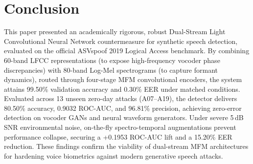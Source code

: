 \documentclass[runningheads]{llncs}
\begin{document}
\section{Conclusion}
\label{sec:conclusion}
This paper presented an academically rigorous, robust Dual-Stream Light Convolutional Neural Network countermeasure for synthetic speech detection, evaluated on the official ASVspoof 2019 Logical Access benchmark. By combining 60-band LFCC representations (to expose high-frequency vocoder phase discrepancies) with 80-band Log-Mel spectrograms (to capture formant dynamics), routed through four-stage MFM convolutional encoders, the system attains 99.50\% validation accuracy and 0.30\% EER under matched conditions. Evaluated across 13 unseen zero-day attacks (A07--A19), the detector delivers 80.50\% accuracy, 0.9032 ROC-AUC, and 96.81\% precision, achieving zero-error detection on vocoder GANs and neural waveform generators. Under severe 5\,dB SNR environmental noise, on-the-fly spectro-temporal augmentations prevent performance collapse, securing a +0.1953 ROC-AUC lift and a 15.20\% EER reduction. These findings confirm the viability of dual-stream MFM architectures for hardening voice biometrics against modern generative speech attacks.
\end{document}
